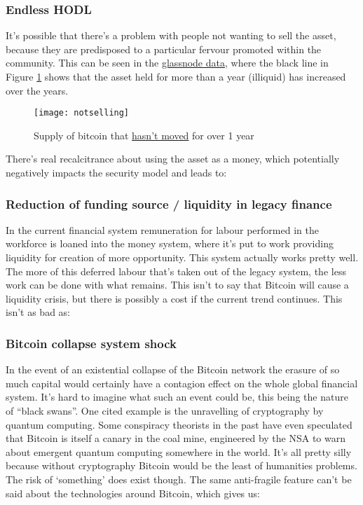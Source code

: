 \begin{itemize}
\subsubsection{Endless HODL}
It's possible that there's a problem with people not wanting to sell the asset, because they are predisposed to a particular fervour promoted within the community. This can be seen in the \href{https://en.macromicro.me/charts/32355/bitcoin-supply-last-active-1plus-years-ago}{glassnode data}, where the black line in Figure \ref{fig:notselling} shows that the asset held for more than a year (illiquid) has increased over the years.
\begin{figure}
  \centering
    \texttt{[image: notselling]}
  \caption{Supply of bitcoin that \href{https://en.macromicro.me/charts/32355/bitcoin-supply-last-active-1plus-years-ago}{hasn't moved} for over 1 year}
  \label{fig:notselling}
\end{figure}
There's real recalcitrance about using the asset as a money, which potentially negatively impacts the security model \cite{Wouters2022} and leads to:
\subsubsection{Reduction of funding source / liquidity in legacy finance}
In the current financial system remuneration for labour performed in the workforce is loaned into the money system, where it's put to work providing liquidity for creation of more opportunity. This system actually works pretty well. The more of this deferred labour that's taken out of the legacy system, the less work can be done with what remains. This isn't to say that Bitcoin will cause a liquidity crisis, but there is possibly a cost if the current trend continues. This isn't as bad as:
\subsubsection{Bitcoin collapse system shock}
In the event of an existential collapse of the Bitcoin network the erasure of so much capital would certainly have a contagion effect on the whole global financial system. It's hard to imagine what such an event could be, this being the nature of ``black swans''. One cited example is the unravelling of cryptography by quantum computing. Some conspiracy theorists in the past have even speculated that Bitcoin is itself a canary in the coal mine, engineered by the NSA to warn about emergent quantum computing somewhere in the world. It's all pretty silly because without cryptography Bitcoin would be the least of humanities problems. The risk of `something' does exist though. The same anti-fragile feature can't be said about the technologies around Bitcoin, which gives us:

\end{itemize}
